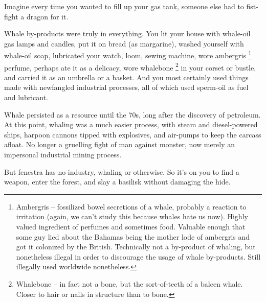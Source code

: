 \begin{multicols}{2}
Imagine every time you wanted to fill up your gas tank, someone else had to fist-fight a dragon for it.

Whale by-products were truly in everything.
You lit your house with whale-oil gas lamps and candles, put it on bread (as margarine), washed yourself with whale-oil soap, lubricated your watch, loom, sewing machine, wore ambergris%
\footnote{Ambergris -- fossilized bowel secretions of a whale, probably a reaction to irritation (again, we can't study this because whales hate us now).
Highly valued ingredient of perfumes and sometimes food.
Valuable enough that some guy lied about the Bahamas being the mother lode of ambergris and got it colonized by the British.
Technically not a by-product of whaling, but nonetheless illegal in order to discourage the usage of whale by-products.
Still illegally used worldwide nonetheless.}
perfume, perhaps ate it as a delicacy, wore whalebone%
\footnote{Whalebone -- in fact not a bone, but the sort-of-teeth of a baleen whale.
Closer to hair or nails in structure than to bone.}
in your corset or bustle, and carried it as an umbrella or a basket.
And you most certainly used things made with newfangled industrial processes, all of which used sperm-oil as fuel and lubricant.

Whale persisted as a resource until the 70s, long after the discovery of petroleum.
At this point, whaling was a much easier process, with steam and diesel-powered ships, harpoon cannons tipped with explosives, and air-pumps to keep the carcass afloat.
No longer a gruelling fight of man against monster, now merely an impersonal industrial mining process.

But \gls{fenestra} has no industry, whaling or otherwise.
So it's on you to find a weapon, enter the forest, and slay a basilisk without damaging the hide.

\end{multicols}

